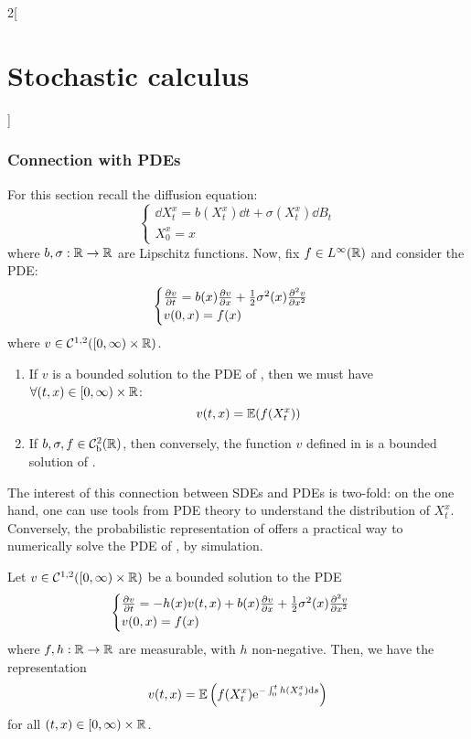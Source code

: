 \documentclass[../../../main_math.tex]{subfiles}
\begin{document}
\begin{multicols}{2}[\section{Stochastic calculus}]
  \subsubsection{Connection with PDEs}
  For this section recall the diffusion equation:
  \begin{equation}\label{SC:sde_pde}
    \begin{cases}
      \dd{X_t^x}=b(X_t^x)\dd{t}+\sigma(X_t^x)\dd{B_t} \\
      X_0^x=x
    \end{cases}
  \end{equation}
  where $b,\sigma:\mathbb{R}\to\mathbb{R}$ are Lipschitz functions. Now, fix $f\in L^\infty(\mathbb{R})$ and consider the PDE:
  \begin{equation}\label{SC:pde_sde}
    \begin{cases}
      \pdv{v}{t}(t,x)=b(x)\pdv{v}{x}(t,x)+\frac{1}{2}\sigma^2(x)\pdv[2]{v}{x}(t,x) \\
      v(0,x)=f(x)
    \end{cases}
  \end{equation}
  where $v\in \mathcal{C}^{1,2}([0,\infty)\times\mathbb{R})$.
  \begin{theorem}\hfill
    \begin{enumerate}
      \item If $v$ is a bounded solution to the PDE of , then we must have $\forall (t,x)\in [0,\infty)\times\mathbb{R}$:
            \begin{equation}\label{SC:sol_v}
              v(t,x)=\mathbb{E}(f(X_t^x))
            \end{equation}
      \item If $b,\sigma, f\in \mathcal{C}_\text{b}^2(\mathbb{R})$, then conversely, the function $v$ defined in  is a bounded solution of .
    \end{enumerate}
  \end{theorem}
  \begin{remark}
    The interest of this connection between SDEs and PDEs is two-fold: on the one hand, one can use tools from PDE theory to understand the distribution of $X_t^x$. Conversely, the probabilistic representation of  offers a practical way to numerically solve the PDE of , by simulation.
  \end{remark}
  \begin{theorem}
    Let $v\in \mathcal{C}^{1,2}([0,\infty)\times\mathbb{R})$ be a bounded solution to the PDE
    $$
      \begin{cases}
        \pdv{v}{t}(t,x)=-h(x)v(t,x)+b(x) \pdv{v}{x}(t,x)+\frac{1}{2}\sigma^2(x)\pdv[2]{v}{x}(t,x) \\
        v(0,x)=f(x)
      \end{cases}
    $$
    where $f,h:\mathbb{R}\to\mathbb{R}$ are measurable, with $h$ non-negative. Then, we have the representation
    $$
      v(t,x)=\mathbb{E}\left(f(X_t^x)\mathrm{e}^{-\int_0^t h(X_s^x)\dd{s}}\right)
    $$
    for all $(t,x)\in [0,\infty)\times\mathbb{R}$.
  \end{theorem}
\end{multicols}
\end{document}
